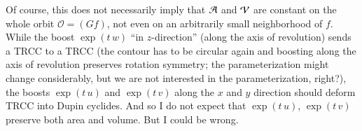 {Of course, this does not necessarily imply that $\operatorname{\mathcal{A}}$ and $\operatorname{\mathcal{V}}$ are constant on the whole orbit $\mathcal{O} = (G f)$, not even on an arbitrarily small neighborhood of $f$. While the boost $\exp(t \, w)$ ``in $z$-direction'' (along the axis of revolution) sends a TRCC to a TRCC (the contour has to be circular again and boosting along the axis of revolution preserves rotation symmetry; the parameterization might change considerably, but we are not interested in the parameterization, right?), the boosts $\exp(t \, u)$ and $\exp(t \, v )$ along the $x$ and $y$ direction should deform TRCC into Dupin cyclides. And so I do not expect that $\exp(t \,u)$, $\exp(t \,v)$ preserve both area and volume. But I could be wrong.
}%

\subsection{}

